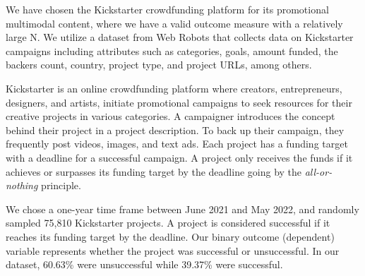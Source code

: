 We have chosen the Kickstarter crowdfunding platform for its promotional multimodal content, where we have a valid outcome measure with a relatively large N. We utilize a dataset from Web Robots \cite{robots2018kickstarter} that collects data on  Kickstarter campaigns 
including attributes such as categories, goals, amount funded, the backers count, country, project type, and project URLs, among others. 


Kickstarter is an online crowdfunding platform where creators, entrepreneurs, designers, and artists, initiate promotional campaigns to seek resources for their creative projects in various categories. A campaigner introduces the concept behind their project in a project description. To back up their campaign, they frequently post videos, images, and text ads. Each project has a funding target with a deadline for a successful campaign. A project only receives the funds if it achieves or surpasses its funding target by the deadline going by the \textit{all-or-nothing} principle. 

We chose a one-year time frame between June 2021 and May 2022, and randomly sampled 75,810 Kickstarter projects. 
A project is considered successful if it reaches its funding target by the deadline. Our binary outcome (dependent) variable represents whether the project was successful or unsuccessful.
In our dataset, 60.63\% were unsuccessful while 39.37\% were successful. 




